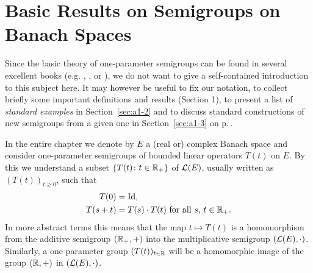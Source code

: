 
\chapter{Basic Results on Semigroups on Banach Spaces}\label{chap:a1}
Since the basic theory of one-parameter semigroups can be found in several excellent books (e.g. \citet{davies:1980}, \citet{goldstein:1985a}, \citet{pazy:1983} or \citet{hillephillips:1957}), we do not want to give a self-contained introduction to this subject here.
It may however be useful to fix our notation, to collect briefly some important definitions and results (Section 1), to present a list of \emph{standard examples} in Section~\ref{sec:a1-2} %
and to discuss standard constructions of new semigroups from a given one in Section~\ref{sec:a1-3} on p.\,\pageref{sec:a1-3}. %

In the entire chapter we denote by $E$ a (real or) complex Banach space and consider one-parameter semigroups of bounded linear operators $T(t)$ on $E$.
By this we understand a subset $\{T(t) \colon  t \in \mathbb{R}_{+}\}$ of $\mathcal{L}(E)$, usually written as $(T(t))_{t\geq0}$, such that
\begin{align*}
	T(0) &= \operatorname{Id}, \\
	T(s+t) &= T(s) \cdot T(t) \text{ for all $s$, $t \in \mathbb{R}_{+}$.}
\end{align*}
In more abstract terms this means that the map $t \mapsto T(t)$ is a homomorphism from the additive semigroup $(\mathbb{R}_{+},+)$ into the multiplicative semigroup $(\mathcal{L}(E),\cdot)$.
Similarly, a one-parameter group $(T(t))_{t\in\mathbb{R}}$ will be a homomorphic image of the group $(\mathbb{R},+)$ in $(\mathcal{L}(E),\cdot)$.
